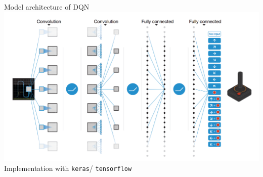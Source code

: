 \documentclass{beamer}
\begin{document}
\begin{frame}{Model architecture of DQN}
\centering
\includegraphics[scale=0.2]{Images/model_architecture.png}
Implementation with \texttt{keras}/ \texttt{tensorflow}
\end{frame}
\end{document}
